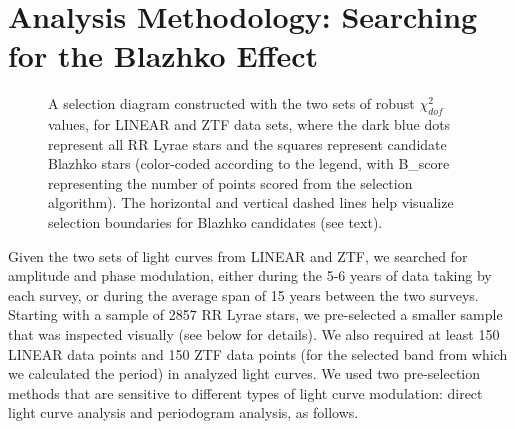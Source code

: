 \section{Analysis Methodology: Searching for the Blazhko Effect  \label{sec:analysis}}  

\begin{figure}[ht]
\caption{A selection diagram constructed with the two sets of robust $\chi^2_{dof}$ values, for LINEAR and ZTF data sets, where
 the dark blue dots represent all RR Lyrae stars and the squares  represent candidate Blazhko stars (color-coded according to the
 legend, with B\_score representing the number of points scored from the selection algorithm).  The horizontal
  and vertical dashed lines help visualize selection boundaries for Blazhko candidates (see text).}
\label{fig:chi2}
\end{figure}


Given the two sets of light curves from LINEAR and ZTF, we searched for amplitude and phase modulation,
either during the 5-6 years of data taking by each survey, or during the average span of 15 years between the two
surveys. Starting with a sample of 2857 RR Lyrae stars, we pre-selected a smaller sample that was inspected
visually (see below for details). We also required at least 150 LINEAR data points and 150 ZTF data points (for the
selected band from which we calculated the period) in analyzed light curves. We used two pre-selection methods
that are sensitive to different types of light curve modulation: direct light curve analysis and periodogram analysis,
as follows.
 

